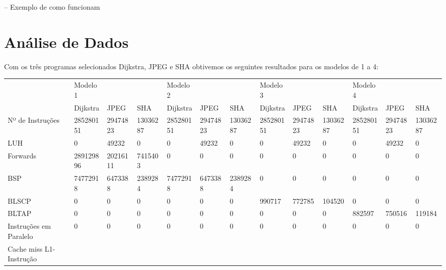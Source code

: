 \documentclass[pdftex,12pt,a4paper]{article}
\begin{document}
-- Exemplo de como funcionam

\section{Análise de Dados}

Com os três programas selecionados Dijkstra, JPEG e SHA obtivemos os seguintes resultados para os modelos de 1 a 4:

\begin{table}[h]
\resizebox{15cm}{!} {
\begin{tabular}{l|lll|lll|lll|lll|}
                        & Modelo 1  &          &          & Modelo 2  &          &          & Modelo 3  &          &          & Modelo 4  &          &          \\
                        & Dijkstra  & JPEG     & SHA      & Dijkstra  & JPEG     & SHA      & Dijkstra  & JPEG     & SHA      & Dijkstra  & JPEG     & SHA      \\ \hline
Nº de Instruções        & 285280151 & 29474823 & 13036287 & 285280151 & 29474823 & 13036287 & 285280151 & 29474823 & 13036287 & 285280151 & 29474823 & 13036287 \\
LUH                     & 0         & 49232    & 0        & 0         & 49232    & 0        & 0         & 49232    & 0        & 0         & 49232    & 0        \\
Forwards                & 289129896 & 20216111 & 7415403  & 0         & 0        & 0        & 0         & 0        & 0        & 0         & 0        & 0        \\
BSP                     & 74772918  & 6473388  & 2389284  & 74772918  & 6473388  & 2389284  & 0         & 0        & 0        & 0         & 0        & 0        \\
BLSCP                   & 0         & 0        & 0        & 0         & 0        & 0        & 990717    & 772785   & 104520   & 0         & 0        & 0        \\
BLTAP                   & 0         & 0        & 0        & 0         & 0        & 0        & 0         & 0        & 0        & 882597    & 750516   & 119184   \\
Instruções em Paralelo  & 0         & 0        & 0        & 0         & 0        & 0        & 0         & 0        & 0        & 0         & 0        & 0        \\
Cache miss L1-Instrução &           &          &          &           &          &          &           &          &          &           &          &          \\

\end{tabular}}
\end{table}
\end{document}
